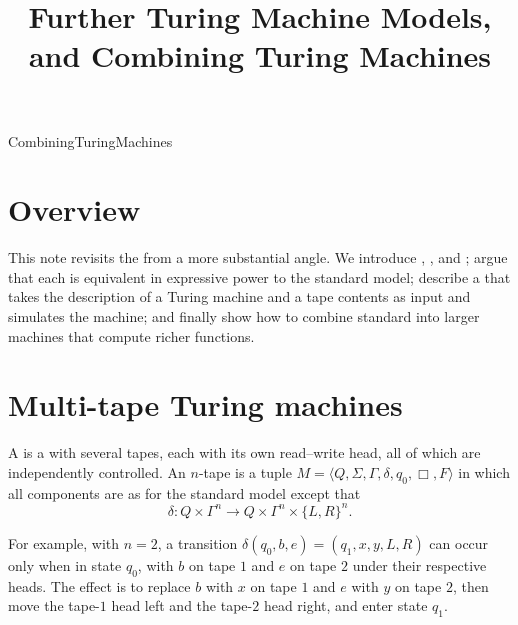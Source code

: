 \documentclass[hidelinks]{article}
\title{Further Turing Machine Models, and Combining Turing Machines}
\author{}
\date{}
\begin{document}
\maketitle

\begin{smodule}[title={Further Turing Machine Models, and Combining Turing Machines}]{CombiningTuringMachines}


\section{Overview}

This note revisits the  from a more substantial angle. We introduce , , and ; argue that each is equivalent in expressive power to the standard model; describe a  that takes the description of a Turing machine and a tape contents as input and simulates the machine; and finally show how to combine standard  into larger machines that compute richer functions.

\section{Multi-tape Turing machines}

\begin{sdefinition}[for=multi-tape Turing machine]
A  is a  with several tapes, each with its own read--write head, all of which are independently controlled. An $n$-tape  is a tuple $M = \langle Q, \Sigma, \Gamma, \delta, q_0, \Box, F \rangle$ in which all components are as for the standard model except that
\[
\delta : Q \times \Gamma^n \to Q \times \Gamma^n \times \{L, R\}^n.
\]
\end{sdefinition}

For example, with $n = 2$, a transition $\delta(q_0, b, e) = (q_1, x, y, L, R)$ can occur only when in state $q_0$, with $b$ on tape $1$ and $e$ on tape $2$ under their respective heads. The effect is to replace $b$ with $x$ on tape $1$ and $e$ with $y$ on tape $2$, then move the tape-$1$ head left and the tape-$2$ head right, and enter state $q_1$.


\end{smodule}
\end{document}
